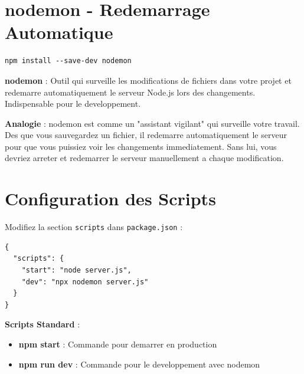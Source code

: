 \documentclass[a4paper,12pt]{book}
\begin{document}
\section{nodemon - Redemarrage Automatique}

\begin{lstlisting}[style=bash, caption=Installation de nodemon (dependance de developpement)]
npm install --save-dev nodemon
\end{lstlisting}

\begin{definitionbox}
    \textbf{nodemon} : Outil qui surveille les modifications de fichiers dans votre projet et redemarre automatiquement le serveur Node.js lors des changements. Indispensable pour le developpement.
\end{definitionbox}

\begin{analogybox}
    \textbf{Analogie} : nodemon est comme un "assistant vigilant" qui surveille votre travail. Des que vous sauvegardez un fichier, il redemarre automatiquement le serveur pour que vous puissiez voir les changements immediatement. Sans lui, vous devriez arreter et redemarrer le serveur manuellement a chaque modification.
\end{analogybox}


\section{Configuration des Scripts}

Modifiez la section \texttt{scripts} dans \texttt{package.json} :

\begin{lstlisting}[style=javascript, caption=Configuration des scripts dans package.json]
{
  "scripts": {
    "start": "node server.js",
    "dev": "npx nodemon server.js"
  }
}
\end{lstlisting}

\begin{bestpracticebox}
    \textbf{Scripts Standard} :
    \begin{itemize}
        \item \textbf{npm start} : Commande pour demarrer en production
        \item \textbf{npm run dev} : Commande pour le developpement avec nodemon
    \end{itemize}
\end{bestpracticebox}
\end{document}
